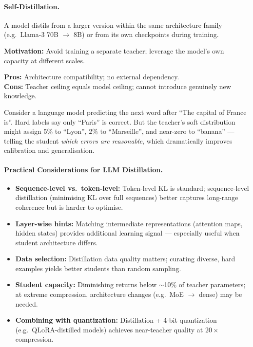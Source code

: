 \paragraph{Self-Distillation.}
\label{self-distillation.}

A model distils from a larger version within the same architecture family (e.g.~Llama-3 70B $\to$ 8B) or from its own checkpoints during training.

\textbf{Motivation:} Avoid training a separate teacher; leverage the model’s own capacity at different scales.

\textbf{Pros:} Architecture compatibility; no external dependency.\\

\textbf{Cons:} Teacher ceiling equals model ceiling; cannot introduce genuinely new knowledge.

\begin{intuitionbox}
Consider a language model predicting the next word after ``The capital of France is''. Hard labels say only ``Paris'' is correct. But the teacher’s soft distribution might assign 5\% to ``Lyon'', 2\% to ``Marseille'', and near-zero to ``banana'' --- telling the student \emph{which errors are reasonable}, which dramatically improves calibration and generalisation.
\end{intuitionbox}

\paragraph{Practical Considerations for LLM Distillation.}
\label{practical-considerations-for-llm-distillation.}

\begin{itemize}
  \item \textbf{Sequence-level vs.~token-level:} Token-level KL is standard; sequence-level distillation (minimising KL over full sequences) better captures long-range coherence but is harder to optimise.
  \item \textbf{Layer-wise hints:} Matching intermediate representations (attention maps, hidden states) provides additional learning signal --- especially useful when student architecture differs.
  \item \textbf{Data selection:} Distillation data quality matters; curating diverse, hard examples yields better students than random sampling.
  \item \textbf{Student capacity:} Diminishing returns below $\sim$10\% of teacher parameters; at extreme compression, architecture changes (e.g.~MoE $\to$ dense) may be needed.
  \item \textbf{Combining with quantization:} Distillation + 4-bit quantization (e.g.~QLoRA-distilled models) achieves near-teacher quality at $20\times$ compression.
\end{itemize}

